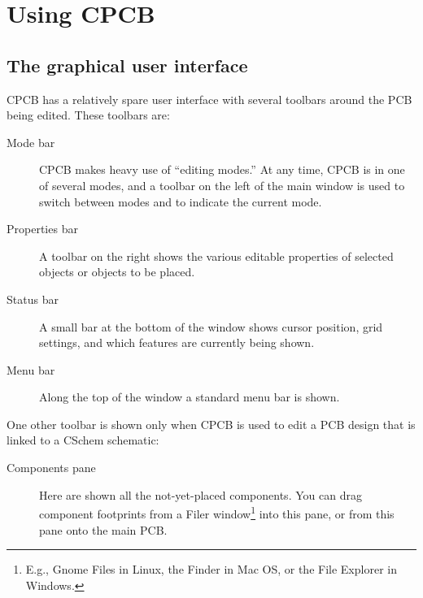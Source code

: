 \documentclass[11pt]{report}
\begin{document}
\chapter{Using CPCB}\label{ch.using}

\section{The graphical user interface}

CPCB has a relatively spare user interface with several toolbars
around the PCB being edited. These toolbars are:
\begin{description}
  \item[Mode bar] CPCB makes heavy use of
``editing modes.'' At any time, CPCB is in one of several modes, and a
toolbar on the left of the main window is used to switch between modes
and to indicate the current mode.
\item[Properties bar]  A toolbar on the right shows the various
  editable properties of
  selected objects or objects to be placed.
\item[Status bar] A small  bar at the bottom of the window shows cursor
  position, grid settings, and which features are currently being shown.
\item[Menu bar]Along the top of the window a standard menu bar is
  shown.
\end{description}
One other toolbar is shown only  when CPCB is used to edit a PCB design that
is linked to a CSchem schematic:
\begin{description}
  \item[Components pane] Here are shown all the not-yet-placed
    components. You can drag component footprints from a Filer
    window\footnote{E.g., Gnome Files in Linux, the Finder
        in Mac OS, or the File Explorer in Windows.} into this pane,
      or from this pane onto the main PCB.
\end{description}
\end{document}
